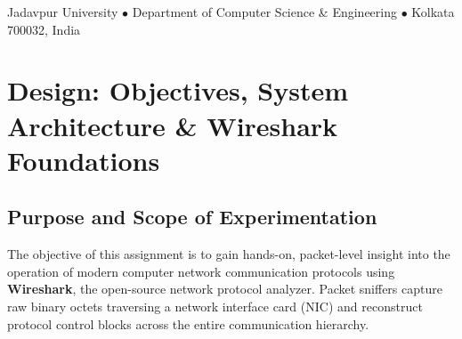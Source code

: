 \documentclass[11pt,a4paper]{article}
\begin{document}
\begin{titlepage}
    \vspace{1.5cm}
    
    \begin{abstract}
    \noindent This laboratory report presents an empirical analysis of live local-area and wide-area network traffic captured using the Wireshark protocol analyzer over an IEEE 802.11 wireless link. The study investigates protocol behaviors across all layers of the TCP/IP protocol suite: Data Link (Ethernet II, Address Resolution Protocol), Network (IPv4, IPv6, ICMP, IGMPv3), Transport (TCP, UDP, QUIC), and Application (HTTP/1.1, DNS, mDNS, TLSv1.3). Key investigations include the ARP-to-ICMP transition during neighbour and gateway resolution, precise timing calculations ($\Delta t = 381.562\,\text{ms}$) between HTTP client request transmission and server response reception, deep packet inspection of application headers in hexadecimal and ASCII representations, bidirectional TCP stream reassembly, and protocol hierarchy distribution across 97,552 captured frames. Furthermore, this report elucidates critical real-world architectural principles, including why the incoming Ethernet source MAC corresponds to the local default gateway (TP-Link) rather than the remote web server's physical card, and how macOS Private Wi-Fi MAC Address randomization affects IEEE OUI registration lookups through the Locally Administered (LG) bit. All analytical conclusions are verified against focused, relevant Wireshark screenshots.
    \end{abstract}
    
    \vfill
    {\footnotesize Jadavpur University $\bullet$ Department of Computer Science \& Engineering $\bullet$ Kolkata 700032, India}
\end{titlepage}

\tableofcontents
\newpage

\section{Design: Objectives, System Architecture \& Wireshark Foundations}

\subsection{Purpose and Scope of Experimentation}
The objective of this assignment is to gain hands-on, packet-level insight into the operation of modern computer network communication protocols using \textbf{Wireshark}, the open-source network protocol analyzer. Packet sniffers capture raw binary octets traversing a network interface card (NIC) and reconstruct protocol control blocks across the entire communication hierarchy.
\end{document}
